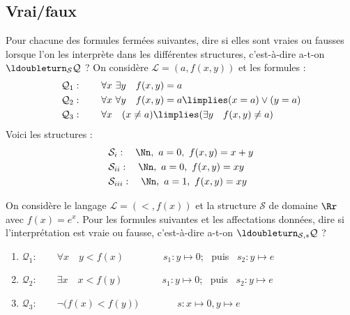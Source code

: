 \documentclass[11pt,class=report,crop=false]{standalone}
\begin{document}
\subsection*{Vrai/faux}

\begin{exercicecours}
Pour chacune des formules fermées suivantes, dire si elles sont vraies ou fausses lorsque l'on les interprète dans les différentes structures, c'est-à-dire a-t-on $\ldoubleturn_{\mathcal{S}} \mathcal{Q}$ ?
On considère $\mathcal{L} = (a, f(x,y))$ et les formules :
\begin{align*}
	&\mathcal{Q}_1 : \qquad \forall x \  \exists y \quad f(x,y) = a \\
	&\mathcal{Q}_2 : \qquad \forall x \  \forall y \quad f(x,y) = a \limplies (x=a) \lor (y=a) \\	
	&\mathcal{Q}_3 : \qquad \forall x \quad (x \neq a) \limplies (\exists y \quad f(x,y) \neq a) \\
\end{align*}
Voici les structures :
\begin{align*}
	&\mathcal{S}_{i} : \quad \Nn, \ a=0, \ f(x,y)= x+y \\
	&\mathcal{S}_{ii} : \quad \Nn, \ a=0, \ f(x,y)= xy \\
	&\mathcal{S}_{iii} : \quad \Nn, \ a=1, \ f(x,y)= xy \\		
\end{align*}
\end{exercicecours}


\begin{exercicecours}
On considère le langage $\mathcal{L} = (<, f(x))$ et la structure $\mathcal{S}$ de domaine $\Rr$ avec $f(x) = e^x$.
Pour les formules suivantes et les affectations données, dire si l'interprétation est vraie ou fausse, c'est-à-dire a-t-on $\ldoubleturn_{\mathcal{S},s} \mathcal{Q}$ ?
\begin{enumerate}
	\item $\mathcal{Q}_1 : \qquad \forall x \quad y < f(x) \qquad\qquad s_1 : y \mapsto 0$; \ puis \ $s_2 : y \mapsto e$
	
	\item $\mathcal{Q}_2 : \qquad \exists x \quad x < f(y) \qquad\qquad s_1 : y \mapsto 0$; \ puis \ $s_2 : y \mapsto e$
	
	\item $\mathcal{Q}_3 : \qquad \lnot\big( f(x) < f(y) \big) \qquad\qquad s : x \mapsto 0, y \mapsto e$
\end{enumerate}	
\end{exercicecours}
\end{document}
